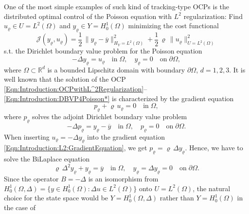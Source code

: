 \documentclass{article}
\numberwithin{equation}{section}
\begin{document}
One of the most simple examples of such kind of tracking-type OCPs is the 
distributed optimal control of the Poisson equation with $L^2$ regularization: 
Find  $u_\varrho \in U = L^2(\Omega)$ and  $y_\varrho \in Y = H^1_0(\Omega)$
minimizing the cost functional 
\begin{equation}\label{Eqn:Introduction:OCPwithL^2Regularization}
  {\mathcal{J}}(y_\varrho,u_\varrho) = \frac{1}{2} \,
  \| y_\varrho - \overline{y} \|_{H_Y=L^2(\Omega)}^2 + \frac{1}{2} \, \varrho \,
  \| u_\varrho \|_{U=L^2(\Omega)}^2 
\end{equation}
s.t. the Dirichlet boundary value problem for the Poisson equation
\begin{equation}\label{Eqn:Introduction:DBVP4Poisson*}
  - \Delta y_\varrho = u_\varrho \quad \mbox{in} \; \Omega, \quad
  y_\varrho = 0 \quad \mbox{on} \; \partial \Omega,
\end{equation}
where $\Omega \subset \mathbb{R}^d$ is a bounded Lipschitz domain 
with boundary $\partial \Omega$, $d=1,2,3$.
It is well known that the solution of the OCP
\eqref{Eqn:Introduction:OCPwithL^2Regularization}--\eqref{Eqn:Introduction:DBVP4Poisson*} is characterized by the gradient equation
\begin{equation}\label{Eqn:Introduction:L2:GradientEquation}
  p_\varrho + \varrho \, u_\varrho = 0 \quad \mbox{in} \; \Omega,
\end{equation}
where $p_\varrho$ solves the adjoint Dirichlet boundary value problem
\begin{equation}\label{Eqn:Introduction:L2:AdjointProblem}
  - \Delta p_\varrho = y_\varrho - \overline{y} \quad
  \mbox{in} \; \Omega, \quad
  p_\varrho = 0 \quad \mbox{on} \; \partial \Omega .
\end{equation}
When inserting $u_\varrho = - \Delta y_\varrho$ into the gradient equation
\eqref{Eqn:Introduction:L2:GradientEquation}, we get
$p_\varrho = \varrho \, \Delta y_\varrho$. Hence, we have to solve the
BiLaplace equation
\begin{equation}\label{Eqn:Introduction:L2:BiLaplace}
  \varrho \, \Delta^2 y_\varrho + y_\varrho = \overline{y}
  \quad \mbox{in} \; \Omega, \quad
  y_\varrho = \Delta y_\varrho =0 \quad
  \mbox{on} \; \partial \Omega .
\end{equation}
Since the operator $B = - \Delta$ is an isomorphism from 
$H^1_0(\Omega,\Delta) = \{y \in H_0^1(\Omega): \Delta u \in L^2(\Omega)\}$
onto $U=L^2(\Omega)$, the natural choice for the state space would be 
$Y=H^1_0(\Omega,\Delta)$ rather than $Y=H_0^1(\Omega)$ in the case of
\end{document}
